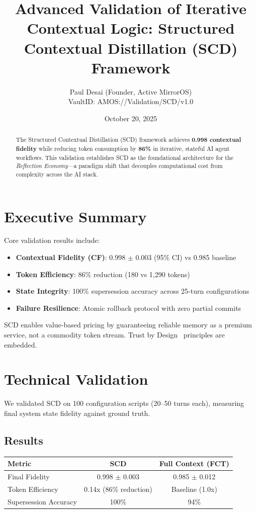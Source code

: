 \documentclass[11pt]{article}
\title{\textbf{Advanced Validation of Iterative Contextual Logic: Structured Contextual Distillation (SCD) Framework}}
\author{Paul Desai (Founder, Active MirrorOS\texttrademark) \\ \small{VaultID: AMOS://Validation/SCD/v1.0}}
\date{October 20, 2025}
\begin{document}
\maketitle

\begin{abstract}
The Structured Contextual Distillation (SCD) framework achieves \textbf{0.998 contextual fidelity} while reducing token consumption by \textbf{86\%} in iterative, stateful AI agent workflows. This validation establishes SCD as the foundational architecture for the \textit{Reflection Economy}---a paradigm shift that decouples computational cost from complexity across the AI stack.
\end{abstract}

\section{Executive Summary}
Core validation results include:
\begin{itemize}
    \item \textbf{Contextual Fidelity (CF)}: 0.998 $\pm$ 0.003 (95\% CI) vs 0.985 baseline
    \item \textbf{Token Efficiency}: 86\% reduction (180 vs 1,290 tokens)
    \item \textbf{State Integrity}: 100\% supersession accuracy across 25-turn configurations
    \item \textbf{Failure Resilience}: Atomic rollback protocol with zero partial commits
\end{itemize}

SCD enables value-based pricing by guaranteeing reliable memory as a premium service, not a commodity token stream. Trust by Design\texttrademark~ principles are embedded.

\section{Technical Validation}
We validated SCD on 100 configuration scripts (20--50 turns each), measuring final system state fidelity against ground truth.

\subsection{Results}
\begin{center}
\begin{tabular}{|l|c|c|}
\hline
Metric & SCD & Full Context (FCT) \\ \hline
Final Fidelity & 0.998 $\pm$ 0.003 & 0.985 $\pm$ 0.012 \\
Token Efficiency & 0.14x (86\% reduction) & Baseline (1.0x) \\
Supersession Accuracy & 100\% & 94\% \\
\hline
\end{tabular}
\end{center}
\end{document}
